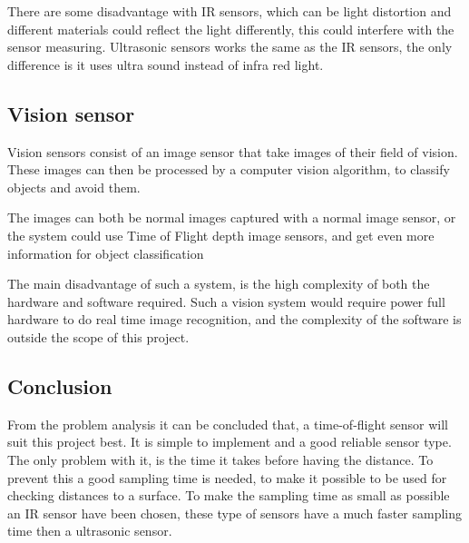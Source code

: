 There are some disadvantage with IR sensors, which can be light distortion and different materials could reflect the light differently, this could interfere with the sensor measuring.
\newline
Ultrasonic sensors works the same as the IR sensors, the only difference is it uses ultra sound instead of infra red light.

\subsection*{Vision sensor}\label{ss:camera_pa}
Vision sensors consist of an image sensor that take images of their field of vision. These images can then be processed by a computer vision algorithm, to classify objects and avoid them.

The images can both be normal images captured with a normal image sensor, or the system could use Time of Flight depth image sensors, and get even more information for object classification

The main disadvantage of such a system, is the high complexity of both the hardware and software required. Such a vision system would require power full hardware to do real time image recognition, and the complexity of the software is outside the scope of this project.

\subsection*{Conclusion}
From the problem analysis it can be concluded that, a time-of-flight sensor will suit this project best. It is simple to implement and a good reliable sensor type. The only problem with it, is the time it takes before having the distance. To prevent this a good sampling time is needed, to make it possible to be used for checking distances to a surface.
\newline
To make the sampling time as small as possible an IR sensor have been chosen, these type of sensors have a much faster sampling time then a ultrasonic sensor.






